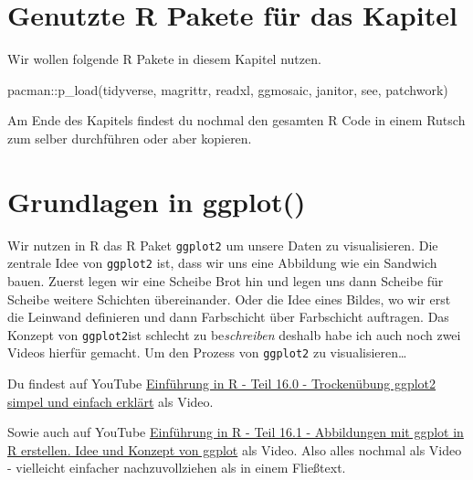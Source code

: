 \documentclass[
  letterpaper,
]{scrbook}
\newenvironment{Shaded}{\begin{snugshade}}{\end{snugshade}}
\newcommand{\FunctionTok}[1]{\textcolor[rgb]{0.28,0.35,0.67}{#1}}
\newcommand{\NormalTok}[1]{\textcolor[rgb]{0.00,0.23,0.31}{#1}}
\newcommand{\SpecialCharTok}[1]{\textcolor[rgb]{0.37,0.37,0.37}{#1}}
\begin{document}
\hypertarget{genutzte-r-pakete-fuxfcr-das-kapitel-2}{%
\section{Genutzte R Pakete für das
Kapitel}\label{genutzte-r-pakete-fuxfcr-das-kapitel-2}}

Wir wollen folgende R Pakete in diesem Kapitel nutzen.

\begin{Shaded}
\begin{Highlighting}[]
\NormalTok{pacman}\SpecialCharTok{::}\FunctionTok{p\_load}\NormalTok{(tidyverse, magrittr, readxl, ggmosaic, }
\NormalTok{               janitor, see, patchwork)}
\end{Highlighting}
\end{Shaded}

Am Ende des Kapitels findest du nochmal den gesamten R Code in einem
Rutsch zum selber durchführen oder aber kopieren.

\hypertarget{grundlagen-in-ggplot}{%
\section{Grundlagen in ggplot()}\label{grundlagen-in-ggplot}}

{}

Wir nutzen in R das R Paket \texttt{ggplot2} um unsere Daten zu
visualisieren. Die zentrale Idee von \texttt{ggplot2} ist, dass wir uns
eine Abbildung wie ein Sandwich bauen. Zuerst legen wir eine Scheibe
Brot hin und legen uns dann Scheibe für Scheibe weitere Schichten
übereinander. Oder die Idee eines Bildes, wo wir erst die Leinwand
definieren und dann Farbschicht über Farbschicht auftragen. Das Konzept
von \texttt{ggplot2}ist schlecht zu be\emph{schreiben} deshalb habe ich
auch noch zwei Videos hierfür gemacht. Um den Prozess von
\texttt{ggplot2} zu visualisieren\ldots{}

\begin{tcolorbox}[enhanced jigsaw, coltitle=black, titlerule=0mm, bottomrule=.15mm, opacityback=0, opacitybacktitle=0.6, leftrule=.75mm, title=\textcolor{quarto-callout-tip-color}{\faLightbulb}\hspace{0.5em}{Grundlagen von ggplot() im Video}, toprule=.15mm, bottomtitle=1mm, toptitle=1mm, left=2mm, breakable, arc=.35mm, colback=white, rightrule=.15mm, colbacktitle=quarto-callout-tip-color!10!white, colframe=quarto-callout-tip-color-frame]
Du findest auf YouTube \href{https://youtu.be/SGwSVzJ9C-s}{Einführung in
R - Teil 16.0 - Trockenübung ggplot2 simpel und einfach erklärt} als
Video.

Sowie auch auf YouTube \href{https://youtu.be/SRRQQO3DXtc}{Einführung in
R - Teil 16.1 - Abbildungen mit ggplot in R erstellen. Idee und Konzept
von ggplot} als Video. Also alles nochmal als Video - vielleicht
einfacher nachzuvollziehen als in einem Fließtext.
\end{tcolorbox}
\end{document}
